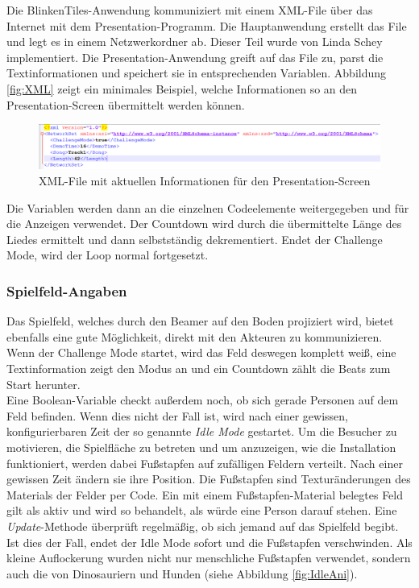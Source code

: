 Die BlinkenTiles-Anwendung kommuniziert mit einem XML-File über das Internet mit dem Presentation-Programm. Die Hauptanwendung erstellt das File und legt es in einem Netzwerkordner ab. Dieser Teil wurde von Linda Schey implementiert. Die Presentation-Anwendung greift auf das File zu, parst die Textinformationen und speichert sie in entsprechenden Variablen. Abbildung \autoref{fig:XML} zeigt ein minimales Beispiel, welche Informationen so an den Presentation-Screen übermittelt werden können.

\begin{figure}[htbp]
	\centering
		\includegraphics[width=1.0\textwidth]{images/XML.png}
	\caption{XML-File mit aktuellen Informationen für den Presentation-Screen }
	\label{fig:XML}
\end{figure}

Die Variablen werden dann an die einzelnen Codeelemente weitergegeben und für die Anzeigen verwendet. Der Countdown wird durch die übermittelte Länge des Liedes ermittelt und dann selbstständig dekrementiert. Endet der Challenge Mode, wird der Loop normal fortgesetzt.

\subsubsection{Spielfeld-Angaben}
Das Spielfeld, welches durch den Beamer auf den Boden projiziert wird, bietet ebenfalls eine gute Möglichkeit, direkt mit den Akteuren zu kommunizieren. Wenn der Challenge Mode startet, wird das Feld deswegen komplett weiß, eine Textinformation zeigt den Modus an und ein Countdown zählt die Beats zum Start herunter.\\
Eine Boolean-Variable checkt außerdem noch, ob sich gerade Personen auf dem Feld befinden. Wenn dies nicht der Fall ist, wird nach einer gewissen, konfigurierbaren Zeit der so genannte \textit{Idle Mode} gestartet. Um die Besucher zu motivieren, die Spielfläche zu betreten und um anzuzeigen, wie die Installation funktioniert, werden dabei Fußstapfen auf zufälligen Feldern verteilt. Nach einer gewissen Zeit ändern sie ihre Position. Die Fußstapfen sind Texturänderungen des Materials der Felder per Code. Ein mit einem Fußstapfen-Material belegtes Feld gilt als aktiv und wird so behandelt, als würde eine Person darauf stehen. Eine \emph{Update}-Methode überprüft regelmäßig, ob sich jemand auf das Spielfeld begibt. Ist dies der Fall, endet der Idle Mode sofort und die Fußstapfen verschwinden. Als kleine Auflockerung wurden nicht nur menschliche Fußstapfen verwendet, sondern auch die von Dinosauriern und Hunden (siehe Abbildung \autoref{fig:IdleAni}).

